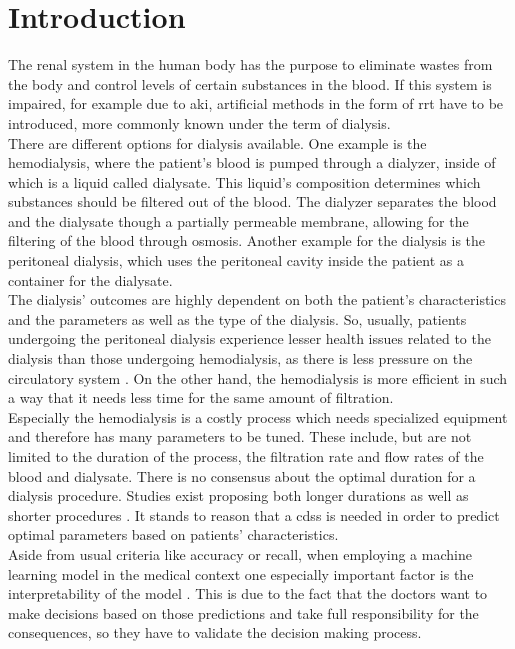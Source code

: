 \documentclass[conference,comsoc]{IEEEtran}
\begin{document}
\section{Introduction}
The renal system in the human body has the purpose to eliminate wastes from the body and control levels of certain substances in the blood. 
If this system is impaired, for example due to \gls{aki}, artificial methods in the form of \gls{rrt} have to be introduced, more commonly known under the term of dialysis. \\
There are different options for dialysis available.
One example is the hemodialysis, where the patient's blood is pumped through a dialyzer, inside of which is a liquid called dialysate.
This liquid's composition determines which substances should be filtered out of the blood.
The dialyzer separates the blood and the dialysate though a partially permeable membrane, allowing for the filtering of the blood through osmosis.
Another example for the dialysis is the peritoneal dialysis, which uses the peritoneal cavity inside the patient as a container for the dialysate. \\
The dialysis’ outcomes are highly dependent on both the patient’s characteristics and the parameters as well as the type of the dialysis. 
So, usually, patients undergoing the peritoneal dialysis experience lesser health issues related to the dialysis than those undergoing hemodialysis, as there is less pressure on the circulatory system \cite{Fenton1997}.
On the other hand, the hemodialysis is more efficient in such a way that it needs less time for the same amount of filtration. \\
Especially the hemodialysis is a costly process which needs specialized equipment and therefore has many parameters to be tuned. 
These include, but are not limited to the duration of the process, the filtration rate and flow rates of the blood and dialysate.
There is no consensus about the optimal duration for a dialysis procedure.
Studies exist proposing both longer durations \cite{jungers2001longer} as well as shorter procedures \cite{ronco1988technical}.
It stands to reason that a \gls{cdss} is needed in order to predict optimal parameters based on patients' characteristics. \\
Aside from usual criteria like accuracy or recall, when employing a machine learning model in the medical context one especially important factor is the interpretability of the model \cite{Katuwal2016}.
This is due to the fact that the doctors want to make decisions based on those predictions and take full responsibility for the consequences, so they have to validate the decision making process.
\end{document}
